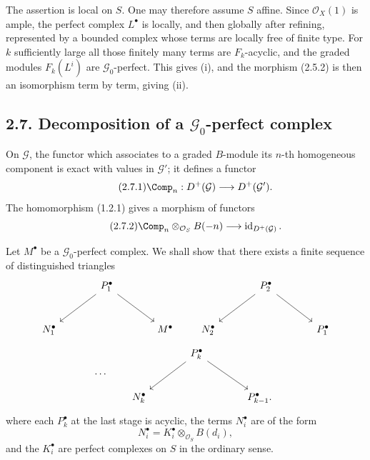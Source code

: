 \documentclass[11pt]{article}
\begin{document}
The assertion is local on \(S\). One may therefore assume \(S\) affine. Since \(\mathcal O_X(1)\) is ample, the perfect complex \(L^\bullet\) is locally, and then globally after refining, represented by a bounded complex whose terms are locally free of finite type. For \(k\) sufficiently large all those finitely many terms are \(F_k\)-acyclic, and the graded modules \(F_k(L^i)\) are \(\mathcal G_0\)-perfect. This gives (i), and the morphism (2.5.2) is then an isomorphism term by term, giving (ii).

\subsection*{2.7. Decomposition of a \(\mathcal G_0\)-perfect complex}
On \(\mathcal G\), the functor which associates to a graded \(B\)-module its \(n\)-th homogeneous component is exact with values in \(\mathcal G'\); it defines a functor
\begin{equation}\tag{2.7.1}
  \Comp_n:D^+(\mathcal G)\longrightarrow D^+(\mathcal G').
\end{equation}
The homomorphism (1.2.1) gives a morphism of functors
\begin{equation}\tag{2.7.2}
  \Comp_n\otimes_{\mathcal O_S}B(-n)\longrightarrow
  \operatorname{id}_{D^+(\mathcal G)}.
\end{equation}

Let \(M^\bullet\) be a \(\mathcal G_0\)-perfect complex. We shall show that there exists a finite sequence of distinguished triangles
\[
\begin{tikzcd}[column sep=large,row sep=large]
& P_1^\bullet \arrow[dl] \arrow[dr] &\\
N_1^\bullet && M^\bullet
\end{tikzcd}
\qquad
\begin{tikzcd}[column sep=large,row sep=large]
& P_2^\bullet \arrow[dl] \arrow[dr] &\\
N_2^\bullet && P_1^\bullet
\end{tikzcd}
\]
\[
\cdots\qquad
\begin{tikzcd}[column sep=large,row sep=large]
& P_k^\bullet \arrow[dl] \arrow[dr] &\\
N_k^\bullet && P_{k-1}^\bullet .
\end{tikzcd}
\]
where each \(P_k^\bullet\) at the last stage is acyclic, the terms \(N_i^\bullet\) are of the form
\[
  N_i^\bullet=K_i^\bullet\otimes_{\mathcal O_S}B(d_i),
\]
and the \(K_i^\bullet\) are perfect complexes on \(S\) in the ordinary sense.
\end{document}
